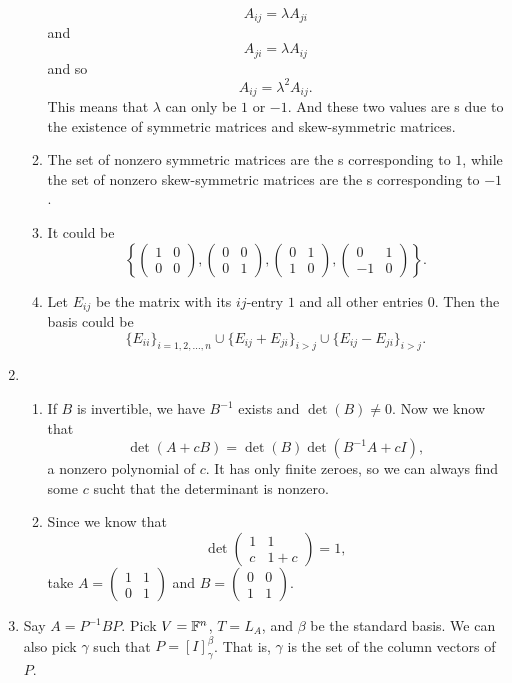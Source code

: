 \begin{enumerate}
\begin{enumerate}
\[A_{ij}=\lambda A_{ji}\]
and 
\[A_{ji}=\lambda A_{ij}\]
and so 
\[A_{ij}=\lambda^2 A_{ij}.\]
This means that $\lambda $ can only be $1$ or $-1$. And these two values are \egva s due to the existence of symmetric matrices and skew-symmetric matrices.
\item The set of nonzero symmetric matrices are the \egve s corresponding to \egva{} $1$, while the set of nonzero skew-symmetric matrices are the \egve s corresponding to \egva{} $-1$.
\item It could be 
\[\left\{\begin{pmatrix}1&0\\0&0\end{pmatrix},\begin{pmatrix}0&0\\0&1\end{pmatrix},\begin{pmatrix}0&1\\1&0\end{pmatrix},\begin{pmatrix}0&1\\-1&0\end{pmatrix}\right\}.
\]
\item Let $E_{ij}$ be the matrix with its $ij$-entry $1$ and all other entries $0$. Then the basis could be 
\[\{E_{ii}\}_{i=1,2,\ldots ,n}\cup \{E_{ij}+E_{ji}\}_{i>j}\cup \{E_{ij}-E_{ji}\}_{i>j}.\]
\end{enumerate}
\item \begin{enumerate}
\item If $B$ is invertible, we have $B^{-1}$ exists and $\det(B)\neq 0$. Now we know that 
\[\det(A+cB)=\det(B)\det(B^{-1}A+cI),\]
a nonzero polynomial of $c$. It has only finite zeroes, so we can always find some $c$ sucht that the determinant is nonzero.
\item Since we know that 
\[\det\begin{pmatrix}1&1\\c&1+c\end{pmatrix}=1,\]
take $A=\begin{pmatrix}1&1\\0&1\end{pmatrix}$ and $B=\begin{pmatrix}0&0\\1&1\end{pmatrix}$.
\end{enumerate}
\item Say $A=P^{-1}BP$. Pick $V=\mathbb{F}^n$, $T=L_A$, and $\beta $ be the standard basis. We can also pick $\gamma $ such that $P=[I]_{\gamma}^{\beta}$. That is, $\gamma $ is the set of the column vectors of $P$.

\end{enumerate}
